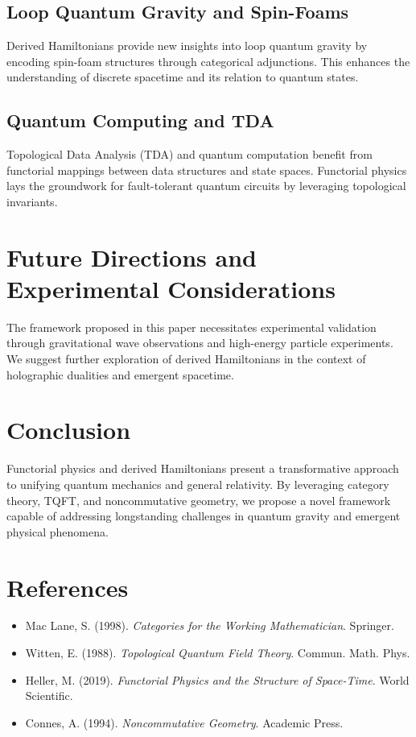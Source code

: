 \documentclass[12pt]{article}
\begin{document}
\subsection{Loop Quantum Gravity and Spin-Foams}
Derived Hamiltonians provide new insights into loop quantum gravity by encoding spin-foam structures through categorical adjunctions. This enhances the understanding of discrete spacetime and its relation to quantum states.

\subsection{Quantum Computing and TDA}
Topological Data Analysis (TDA) and quantum computation benefit from functorial mappings between data structures and state spaces. Functorial physics lays the groundwork for fault-tolerant quantum circuits by leveraging topological invariants.

\section{Future Directions and Experimental Considerations}
The framework proposed in this paper necessitates experimental validation through gravitational wave observations and high-energy particle experiments. We suggest further exploration of derived Hamiltonians in the context of holographic dualities and emergent spacetime.

\section{Conclusion}
Functorial physics and derived Hamiltonians present a transformative approach to unifying quantum mechanics and general relativity. By leveraging category theory, TQFT, and noncommutative geometry, we propose a novel framework capable of addressing longstanding challenges in quantum gravity and emergent physical phenomena.

\section*{References}
\begin{itemize}
    \item Mac Lane, S. (1998). \textit{Categories for the Working Mathematician}. Springer.
    \item Witten, E. (1988). \textit{Topological Quantum Field Theory}. Commun. Math. Phys.
    \item Heller, M. (2019). \textit{Functorial Physics and the Structure of Space-Time}. World Scientific.
    \item Connes, A. (1994). \textit{Noncommutative Geometry}. Academic Press.
\end{itemize}
\end{document}
